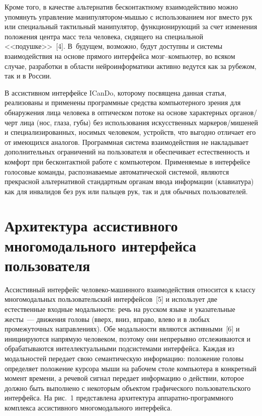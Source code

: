 \begin{multicols}{2}
  Кроме того, в качестве альтернатив бесконтактному взаимодействию можно 
упомянуть управление манипулятором-мышью с использованием ног вместо 
рук или специальный тактильный манипулятор, функционирующий за счет 
изменения положения центра масс тела человека, сидящего на специальной 
<<подушке>>~[4]. В~будущем, возможно, будут доступны и системы 
взаимодействия на основе прямого интерфейса мозг--ком\-пьютер, во всяком 
случае, разработки в области нейроинформатики активно ведутся как за 
рубежом, так и в России.
  
  В ассистивном интерфейсе ICanDo, которому посвящена данная статья, 
реализованы и применены программные средства компьютерного зрения для 
обнаружения лица человека в оптическом потоке на основе характерных 
органов/черт лица (нос, глаза, губы) без использования искусственных 
маркеров/мишеней и специализированных, носимых человеком, устройств, что 
выгодно отличает его от имеющихся аналогов. Программная система 
взаимодействия не накладывает дополнительных ограничений на пользователя 
и обеспечивает естественность и комфорт при бесконтактной работе с 
компьютером. Применяемые в интерфейсе голосовые команды, 
распознаваемые автоматической сис\-те\-мой, являются прекрасной альтернативой 
стандартным органам ввода информации (клавиатура) как для инвалидов без 
рук или пальцев рук, так и для обычных пользователей.

\section{Архитектура ассистивного многомодального интерфейса 
пользователя}
  
  Ассистивный интерфейс человеко-машинного взаимодействия относится к 
классу многомодальных пользовательский интерфейсов~[5] и использует две 
естественные входные модальности: речь на русском языке и указательные 
жесты~--- движения головы (вверх, вниз, вправо, влево и в любых 
промежуточных направлениях). Обе модальности являются активными~[6] и 
инициируются напрямую человеком, поэтому они непрерывно отслеживаются 
и обрабатываются интеллектуальными подсистемами интерфейса. Каждая из 
модальностей передает свою семантическую информацию: положение головы 
определяет положение курсора мыши на рабочем столе компьютера в 
конкретный момент времени, а речевой сигнал передает информацию о 
действии, которое должно быть выполнено с некоторым объектом 
графического пользовательского интерфейса. На рис.~1 представлена 
архитектура ап\-па\-рат\-но-программного комплекса ассистивного 
многомодального интерфейса.


\end{multicols}
